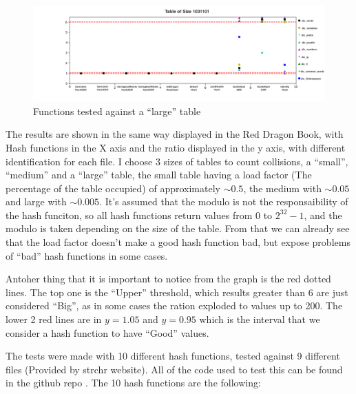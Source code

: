 \medskip

\begin{figure}[h!]
  \raggedleft
  \includegraphics[width=18cm]{figuras/1031101HashFunc.png}
  \caption{Functions tested against a ``large'' table}
\end{figure}

\medskip

The results are shown in the same way displayed in the Red Dragon Book, with Hash functions in the X axis and the ratio displayed in the y axis, with different identification for each file. I choose 3 sizes of tables to count collisions, a ``small'', ``medium'' and a ``large'' table, the small table having a load factor (The percentage of the table occupied) of approximately \( \sim 0.5 \), the medium with \( \sim 0.05 \) and large with \( \sim 0.005 \). It's assumed that the modulo is not the responsaibility of the hash funciton, so all hash functions return values from 0 to \( 2^{32} - 1 \), and the modulo is taken depending on the size of the table. From that we can already see that the load factor doesn't make a good hash function bad, but expose problems of ``bad'' hash functions in some cases. 

Antoher thing that it is important to notice from the graph is the red dotted lines. The top one is the ``Upper'' threshold, which results greater than 6 are just considered ``Big'', as in some cases the ration exploded to values up to 200. The lower 2 red lines are in \( y = 1.05 \) and \( y = 0.95 \) which is the interval that we consider a hash function to have ``Good'' values. 

The tests were made with 10 different hash functions, tested against 9 different files (Provided by strchr website). All of the code used to test this can be found in the github repo \cite{GithubRepo}. The 10 hash functions are the following:

